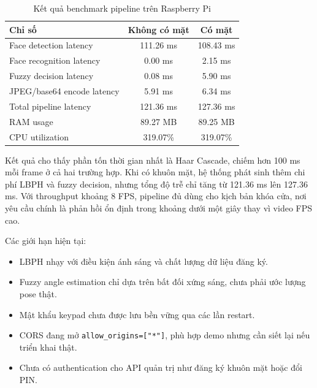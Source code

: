 \begin{table}[H]
\centering
\caption{Kết quả benchmark pipeline trên Raspberry Pi}
\label{tab:benchmark_results}
\begin{tabular}{|l|c|c|}
\hline
\textbf{Chỉ số} & \textbf{Không có mặt} & \textbf{Có mặt} \\
\hline
Face detection latency & 111.26 ms & 108.43 ms \\
\hline
Face recognition latency & 0.00 ms & 2.15 ms \\
\hline
Fuzzy decision latency & 0.08 ms & 5.90 ms \\
\hline
JPEG/base64 encode latency & 5.91 ms & 6.34 ms \\
\hline
Total pipeline latency & 121.36 ms & 127.36 ms \\
\hline
RAM usage & 89.27 MB & 89.25 MB \\
\hline
CPU utilization & 319.07\% & 319.07\% \\
\hline
\end{tabular}
\end{table}

Kết quả cho thấy phần tốn thời gian nhất là Haar Cascade, chiếm hơn 100 ms mỗi frame ở cả hai trường hợp. Khi có khuôn mặt, hệ thống phát sinh thêm chi phí LBPH và fuzzy decision, nhưng tổng độ trễ chỉ tăng từ 121.36 ms lên 127.36 ms. Với throughput khoảng 8 FPS, pipeline đủ dùng cho kịch bản khóa cửa, nơi yêu cầu chính là phản hồi ổn định trong khoảng dưới một giây thay vì video FPS cao.

Các giới hạn hiện tại:

\begin{itemize}
    \item LBPH nhạy với điều kiện ánh sáng và chất lượng dữ liệu đăng ký.
    \item Fuzzy angle estimation chỉ dựa trên bất đối xứng sáng, chưa phải ước lượng pose thật.
    \item Mật khẩu keypad chưa được lưu bền vững qua các lần restart.
    \item CORS đang mở \texttt{allow\_origins=["*"]}, phù hợp demo nhưng cần siết lại nếu triển khai thật.
    \item Chưa có authentication cho API quản trị như đăng ký khuôn mặt hoặc đổi PIN.
\end{itemize}

